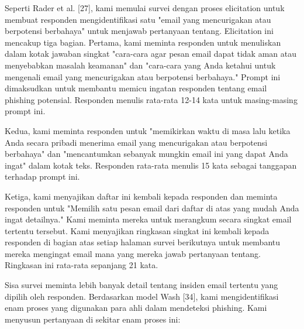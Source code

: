 \documentclass[lettersize,journal]{IEEEtran}
\begin{document}
Seperti Rader et al. [27], kami memulai survei dengan proses elicitation untuk membuat responden mengidentifikasi satu "email yang mencurigakan atau berpotensi berbahaya" untuk menjawab pertanyaan tentang. Elicitation ini mencakup tiga bagian. Pertama, kami meminta responden untuk menuliskan dalam kotak jawaban singkat "cara-cara agar pesan email dapat tidak aman atau menyebabkan masalah keamanan" dan "cara-cara yang Anda ketahui untuk mengenali email yang mencurigakan atau berpotensi berbahaya." Prompt ini dimaksudkan untuk membantu memicu ingatan responden tentang email phishing potensial. Responden menulis rata-rata 12-14 kata untuk masing-masing prompt ini.

Kedua, kami meminta responden untuk "memikirkan waktu di masa lalu ketika Anda secara pribadi menerima email yang mencurigakan atau berpotensi berbahaya" dan "mencantumkan sebanyak mungkin email ini yang dapat Anda ingat" dalam kotak teks. Responden rata-rata menulis 15 kata sebagai tanggapan terhadap prompt ini.

Ketiga, kami menyajikan daftar ini kembali kepada responden dan meminta responden untuk "Memilih satu pesan email dari daftar di atas yang mudah Anda ingat detailnya." Kami meminta mereka untuk merangkum secara singkat email tertentu tersebut. Kami menyajikan ringkasan singkat ini kembali kepada responden di bagian atas setiap halaman survei berikutnya untuk membantu mereka mengingat email mana yang mereka jawab pertanyaan tentang. Ringkasan ini rata-rata sepanjang 21 kata.

Sisa survei meminta lebih banyak detail tentang insiden email tertentu yang dipilih oleh responden. Berdasarkan model Wash [34], kami mengidentifikasi enam proses yang digunakan para ahli dalam mendeteksi phishing. Kami menyusun pertanyaan di sekitar enam proses ini:
\end{document}
